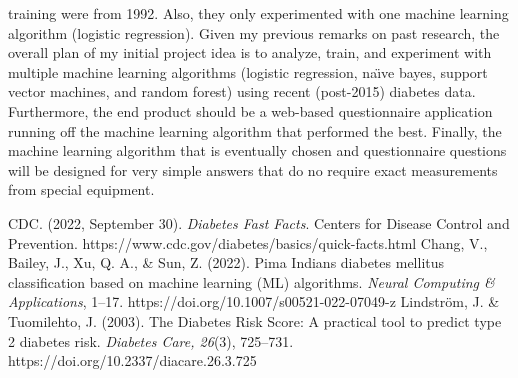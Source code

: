 \documentclass[11pt]{article}
\begin{document}
training were from 1992.  Also, they only experimented with one machine learning algorithm (logistic regression).  Given my previous remarks on past research, the overall plan of my initial project idea is to analyze, train, and experiment with multiple machine learning algorithms (logistic regression, na{\"\i}ve bayes, support vector machines, and random forest) using recent (post-2015) diabetes data.  Furthermore, the end product should be a web-based questionnaire application running off the machine learning algorithm that performed the best. Finally, the machine learning algorithm that is eventually chosen and questionnaire questions will be designed for very simple answers that do no require exact measurements from special equipment.                       
	
	\begin{thebibliography}{3}
		CDC. (2022, September 30). \textit{Diabetes Fast Facts}. Centers for Disease Control and Prevention. https://www.cdc.gov/diabetes/basics/quick-facts.html   
		Chang, V., Bailey, J., Xu, Q. A., \& Sun, Z. (2022). Pima Indians diabetes mellitus classification based on machine learning (ML) algorithms. \textit{Neural Computing \& Applications}, 1–17. https://doi.org/10.1007/s00521-022-07049-z
		Lindstr{\"o}m, J. \& Tuomilehto, J. (2003). The Diabetes Risk Score: A practical tool to predict type 2 diabetes risk. \textit{Diabetes Care, 26}(3), 725–731. https://doi.org/10.2337/diacare.26.3.725
	\end{thebibliography}
\end{document}
